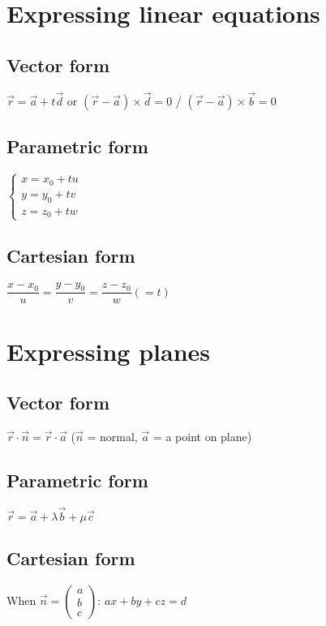 \section{Expressing linear equations}

\subsection{Vector form}
$\vec{r}=\vec{a}+t\vec{d}$ or $(\vec{r}-\vec{a})\times\vec{d}=0$ / $(\vec{r}-\vec{a})\times\vec{b}=0$
\subsection{Parametric form}
$\begin{cases}
        x=x_0+tu \\
        y=y_0+tv \\
        z=z_0+tw
    \end{cases}$
\subsection{Cartesian form}
$\dfrac{x-x_0}{u}=\dfrac{y-y_0}{v}=\dfrac{z-z_0}{w}(=t)$

\section{Expressing planes}
\subsection{Vector form}
$\vec{r} \cdot \vec{n} = \vec{r} \cdot \vec{a}$ ($\vec{n}$ = normal, $\vec{a}$ = a point on plane)
\subsection{Parametric form}
$\vec{r}=\vec{a}+\lambda\vec{b}+\mu\vec{c}$
\subsection{Cartesian form}
When $\vec{n} = \begin{pmatrix}a\\b\\c\end{pmatrix}$: $ax+by+cz=d$

